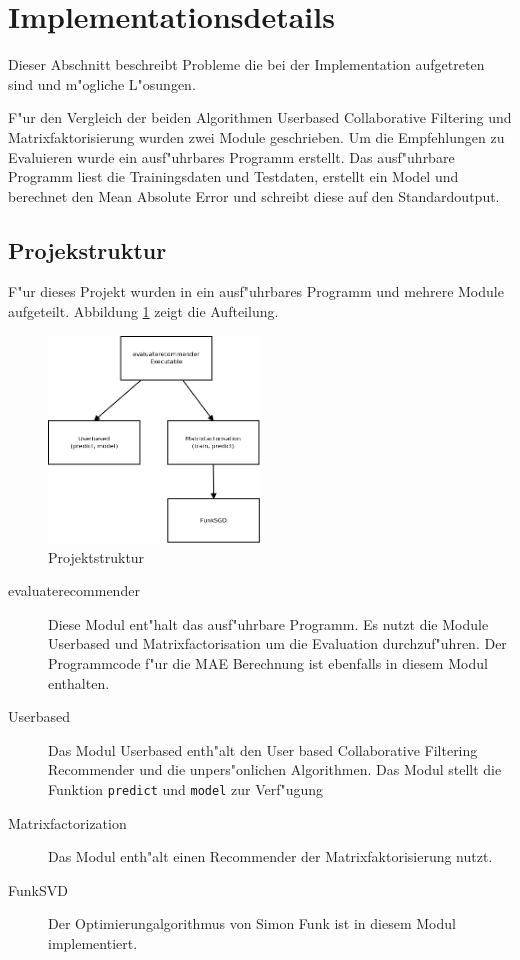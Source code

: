 \documentclass[a4paper, 12pt]{article}
\begin{document}
\section{Implementationsdetails}
\label{sec:ram}

Dieser Abschnitt beschreibt Probleme die bei der Implementation aufgetreten sind und m"ogliche L"osungen.

F"ur den Vergleich der beiden Algorithmen Userbased Collaborative Filtering und Matrixfaktorisierung wurden zwei Module geschrieben. Um die Empfehlungen zu Evaluieren wurde ein ausf"uhrbares Programm erstellt. Das ausf"uhrbare Programm liest die Trainingsdaten und Testdaten, erstellt ein Model und berechnet den Mean Absolute Error und schreibt diese auf den Standardoutput.


\subsection{Projekstruktur}
\label{sec:structur}

F"ur dieses Projekt wurden in ein ausf"uhrbares Programm und mehrere Module aufgeteilt. Abbildung \ref{fig:structur} zeigt die Aufteilung.

\begin{figure}
  \centering
      \includegraphics[width=0.5\textwidth]{structur}
  \caption{Projektstruktur}
  \label{fig:structur}
\end{figure}

\begin{description}
\item[evaluaterecommender] Diese Modul ent"halt das ausf"uhrbare Programm. Es nutzt die Module Userbased und Matrixfactorisation um die Evaluation durchzuf"uhren. Der Programmcode f"ur die MAE Berechnung ist ebenfalls in diesem Modul enthalten.
\item[Userbased] Das Modul Userbased enth"alt den User based Collaborative Filtering Recommender und die unpers"onlichen Algorithmen. Das Modul stellt die Funktion \verb|predict| und \verb|model| zur Verf"ugung
\item[Matrixfactorization] Das Modul enth"alt einen Recommender der Matrixfaktorisierung nutzt.
\item[FunkSVD] Der Optimierungalgorithmus von Simon Funk ist in diesem Modul implementiert.
\end{description}
\end{document}
